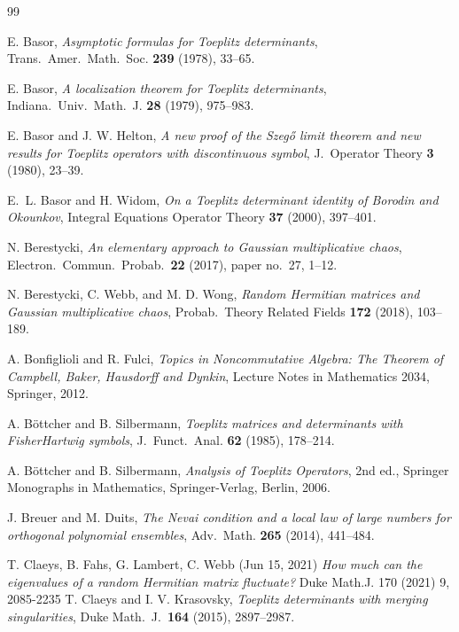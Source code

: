 \documentclass[11pt]{amsart}
\theoremstyle{plain}
\theoremstyle{remark}
\numberwithin{equation}{section}
\begin{document}
\begin{thebibliography}{99}

 E. Basor, \emph{Asymptotic formulas for Toeplitz determinants}, Trans.\ Amer.\ Math.\ Soc. \textbf{239} (1978), 33--65.

 E. Basor, \emph{A localization theorem for Toeplitz determinants}, Indiana.\ Univ.\ Math.\ J. \textbf{28} (1979), 975--983.

E. Basor and J. W. Helton,
\emph{A new proof of the Szeg\H{o} limit theorem and new results for Toeplitz operators with discontinuous symbol},
J.\ Operator Theory \textbf{3} (1980), 23--39.

E.~L. Basor and H. Widom,
\emph{On a Toeplitz determinant identity of Borodin and Okounkov},
Integral Equations Operator Theory \textbf{37} (2000), 397--401.

N. Berestycki,
\emph{An elementary approach to Gaussian multiplicative chaos},
Electron.\ Commun.\ Probab.\ \textbf{22} (2017), paper no.~27, 1--12.

N. Berestycki, C. Webb, and M. D. Wong, \emph{Random Hermitian matrices and Gaussian multiplicative chaos}, Probab.\ Theory Related Fields \textbf{172} (2018), 103--189.

 A. Bonfiglioli and R. Fulci, \emph{Topics in Noncommutative Algebra: The Theorem of Campbell, Baker, Hausdorff and Dynkin}, Lecture Notes in Mathematics 2034, Springer, 2012.

 A. B\"ottcher and B. Silbermann, \emph{Toeplitz matrices and determinants with FisherHartwig symbols}, J.\ Funct.\ Anal. \textbf{62} (1985), 178--214.

 A. B\"ottcher and B. Silbermann, \emph{Analysis of Toeplitz Operators}, 2nd ed., Springer Monographs in Mathematics, Springer-Verlag, Berlin, 2006.

J. Breuer and M. Duits, \emph{The Nevai condition and a local law of large numbers for orthogonal polynomial ensembles}, Adv.\ Math. \textbf{265} (2014), 441--484.



 T. Claeys, B. Fahs, G. Lambert, C. Webb (Jun 15, 2021)
\emph{How much can the eigenvalues of a random Hermitian matrix fluctuate?} Duke Math.J. 170 (2021) 9, 2085-2235
T. Claeys and I. V. Krasovsky,
\emph{Toeplitz determinants with merging singularities},
Duke Math.\ J.\ \textbf{164} (2015), 2897--2987.


\end{thebibliography}
\end{document}
